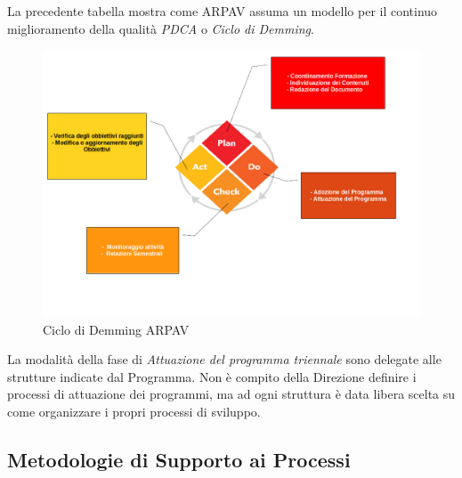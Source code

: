 La precedente tabella mostra come ARPAV assuma un modello per il continuo miglioramento della qualità \textit{PDCA} o \textit{Ciclo di Demming}.

\begin{figure}[htpb]


\includegraphics[scale=0.5]{./capitoli/capitolo1/img/demming}
\caption{Ciclo di Demming ARPAV}
\end{figure}

La modalità della fase di \textit{Attuazione del programma triennale} sono delegate alle strutture indicate dal Programma. Non è compito della Direzione definire i processi di attuazione dei programmi, ma ad ogni struttura è data libera scelta su come organizzare i propri processi di sviluppo. \\

\subsection{Metodologie di Supporto ai Processi}


